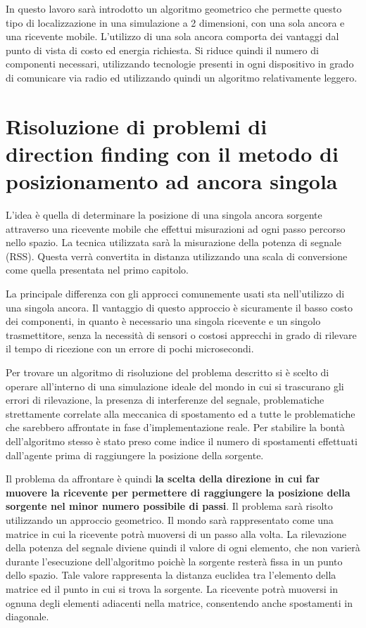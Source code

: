 In questo lavoro sarà introdotto un algoritmo geometrico che permette questo tipo di localizzazione in una simulazione a 2 dimensioni, con una sola ancora e una ricevente mobile. L'utilizzo di una sola ancora comporta dei vantaggi dal punto di vista di costo ed energia richiesta. Si riduce quindi il numero di componenti necessari, utilizzando tecnologie presenti in ogni dispositivo in grado di comunicare via radio ed utilizzando quindi un algoritmo relativamente leggero.
	
\section{Risoluzione di problemi di direction finding con il metodo di posizionamento ad ancora singola}
L'idea è quella di determinare la posizione di una singola ancora sorgente attraverso una ricevente mobile che effettui misurazioni ad ogni passo percorso nello spazio. La tecnica utilizzata sarà la misurazione della potenza di segnale (RSS). Questa verrà convertita in distanza utilizzando una scala di conversione come quella presentata nel primo capitolo.

La principale differenza con gli approcci comunemente usati sta nell'utilizzo di una singola ancora. 
Il vantaggio di questo approccio è sicuramente il basso costo dei componenti, in quanto è necessario una singola ricevente e un singolo trasmettitore, senza la necessità di sensori o costosi apprecchi in grado di rilevare il tempo di ricezione con un errore di pochi microsecondi.

Per trovare un algoritmo di risoluzione del problema descritto si è scelto di operare all'interno di una simulazione ideale del mondo in cui si trascurano gli errori di rilevazione, la presenza di interferenze del segnale, problematiche strettamente correlate alla meccanica di spostamento ed a tutte le problematiche che sarebbero affrontate in fase d'implementazione reale. Per stabilire la bontà dell'algoritmo stesso è stato preso come indice il numero di spostamenti effettuati dall'agente prima di raggiungere la posizione della sorgente.

Il problema da affrontare è quindi \textbf{la scelta della direzione in cui far muovere la ricevente per permettere di raggiungere la posizione della sorgente nel minor numero possibile di passi}. Il problema sarà risolto utilizzando un approccio geometrico. Il mondo sarà rappresentato come una matrice in cui la ricevente potrà muoversi di un passo alla volta. La rilevazione della potenza del segnale diviene quindi il valore di ogni elemento, che non varierà durante l'esecuzione dell'algoritmo poichè la sorgente resterà fissa in un punto dello spazio. Tale valore rappresenta la distanza euclidea tra l'elemento della matrice ed il punto in cui si trova la sorgente. La ricevente potrà muoversi in ognuna degli elementi adiacenti nella matrice, consentendo anche spostamenti in diagonale. 

